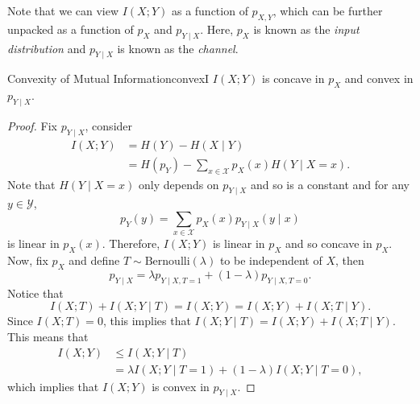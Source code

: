 \documentclass[math, code]{amznotes}
\theoremstyle{remark}
\begin{document}
Note that we can view $I\left(X ; Y\right)$ as a function of $p_{X, Y}$, which can be further unpacked as a function of $p_X$ and $p_{Y \mid X}$. Here, $p_X$ is known as the \textit{input distribution} and $p_{Y \mid X}$ is known as the \textit{channel}.
\begin{thmbox}{Convexity of Mutual Information}{convexI}
    $I\left(X ; Y\right)$ is concave in $p_X$ and convex in $p_{Y \mid X}$.
    \tcblower
    \begin{proof}
        Fix $p_{Y \mid X}$, consider
        \begin{align*}
            I\left(X ; Y\right) & = H\left(Y\right) - H\left(X \mid Y\right) \\
            & = H\left(p_Y\right) - \sum_{x \in \mathcal{X}}p_X\left(x\right)H\left(Y \mid X = x\right).
        \end{align*}
        Note that $H\left(Y \mid X = x\right)$ only depends on $p_{Y \mid X}$ and so is a constant and for any $y \in \mathcal{Y}$,
        \begin{equation*}
            p_Y\left(y\right) = \sum_{x \in \mathcal{X}}p_X\left(x\right)p_{Y \mid X}\left(y \mid x\right)
        \end{equation*}
        is linear in $p_X\left(x\right)$. Therefore, $I\left(X ; Y\right)$ is linear in $p_X$ and so concave in $p_X$. Now, fix $p_X$ and define $T \sim \mathrm{Bernoulli}\left(\lambda\right)$ to be independent of $X$, then 
        \begin{equation*}
            p_{Y \mid X} = \lambda p_{Y \mid X, T = 1} + \left(1 - \lambda\right)p_{Y \mid X, T = 0}.
        \end{equation*}
        Notice that 
        \begin{equation*}
            I\left(X ; T\right) + I\left(X ; Y \mid T\right) = I\left(X ; Y\right) = I\left(X ; Y\right) + I\left(X ; T \mid Y\right).
        \end{equation*}
        Since $I\left(X ; T\right) = 0$, this implies that $I\left(X ; Y \mid T\right) = I\left(X ; Y\right) + I\left(X ; T \mid Y\right)$. This means that 
        \begin{align*}
            I\left(X ; Y\right) & \leq I\left(X ; Y \mid T\right) \\
            & = \lambda I\left(X ; Y \mid T = 1\right) + \left(1 - \lambda\right)I\left(X ; Y \mid T = 0\right),
        \end{align*}
        which implies that $I\left(X ; Y\right)$ is convex in $p_{Y \mid X}$. 
    \end{proof}
\end{thmbox}
\end{document}
